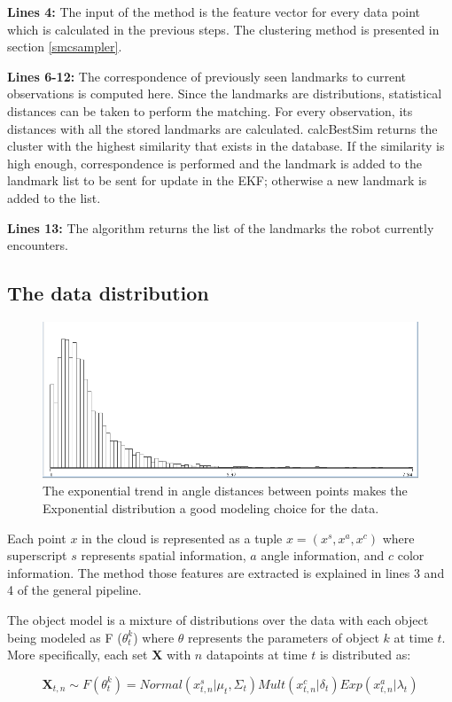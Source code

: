 \documentclass [twoside,hidelinks]{article}
\begin{document}
\textbf{Lines 4:} The input of the method is the feature vector for every data point which is calculated in the previous steps. The clustering method is presented in section \ref{smcsampler}. 

\textbf{Lines 6-12:} The correspondence of previously seen landmarks to current observations is computed here. Since the landmarks are distributions, statistical distances can be taken to perform the matching. For every observation, its distances with all the stored landmarks are calculated. calcBestSim returns the cluster with the highest similarity that exists in the database. If the similarity is high enough, correspondence is performed and the landmark is added to the landmark list to be sent for update in the EKF; otherwise a new landmark is added to the list.

\textbf{Lines 13:} The algorithm returns the list of the landmarks the robot currently encounters.

\subsection{The data distribution}
\label{data:dist}

\begin{figure}
    \centering
    \includegraphics [width=.35\textwidth]{Kullback-Leibler}
    \caption{The exponential trend in angle distances between points makes the Exponential distribution a good modeling choice for the data.}
    \label{pcl:kl}
\end{figure}

Each point $x$ in the cloud is represented as a tuple $x = (x^s, x^a, x^c ) $ where superscript $s$ represents spatial information, $a$ angle information, and $c$ color information. The method those features are extracted is explained in lines 3 and 4 of the general pipeline.

The object model is a mixture of distributions over the data with each object being modeled as F ($\theta_t^k$) where $\theta$ represents the parameters of object $k$ at time $t$. More specifically, each set \textbf{X} with $n$ datapoints at time $t$ is distributed as:

\begin{equation}
    \textbf{X}_{t,n} \sim F (\theta_t^k) = Normal (x_{t,n}^s| \mu_t, \Sigma_t) Mult (x_{t,n}^c | \delta_t) Exp (x_{t,n}^a | \lambda_t) 
\end{equation}
\end{document}
